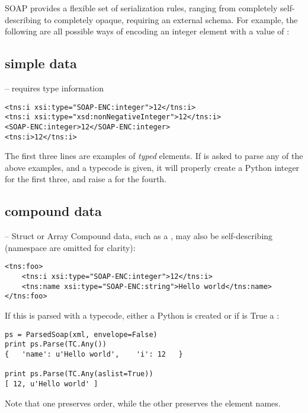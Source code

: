 SOAP provides a flexible set of serialization rules, ranging from
completely self-describing to completely opaque, requiring an external
schema. For example, the following are all possible ways of encoding an
integer element  with a value of :

\subsection{simple data} -- requires type information
\begin{verbatim}
<tns:i xsi:type="SOAP-ENC:integer">12</tns:i>
<tns:i xsi:type="xsd:nonNegativeInteger">12</tns:i>
<SOAP-ENC:integer>12</SOAP-ENC:integer>
<tns:i>12</tns:i>
\end{verbatim}

The first three lines are examples of \emph{typed} elements.
If \ZSI{} is asked to parse any of the above examples, and a
 typecode is given, it will properly create a Python
integer for the first three, and raise a 
for the fourth.

\subsection{compound data} -- Struct or Array
Compound data, such as a , may also be self-describing (namespace
are omitted for clarity):
\begin{verbatim}
<tns:foo>
    <tns:i xsi:type="SOAP-ENC:integer">12</tns:i>
    <tns:name xsi:type="SOAP-ENC:string">Hello world</tns:name>
</tns:foo>
\end{verbatim}

If this is parsed with a  typecode, either a Python 
is created or if  is True a :
\begin{verbatim}
ps = ParsedSoap(xml, envelope=False)
print ps.Parse(TC.Any())
{   'name': u'Hello world',    'i': 12   }

print ps.Parse(TC.Any(aslist=True))
[ 12, u'Hello world' ]
\end{verbatim}
Note that one preserves order, while the other preserves the element names.

